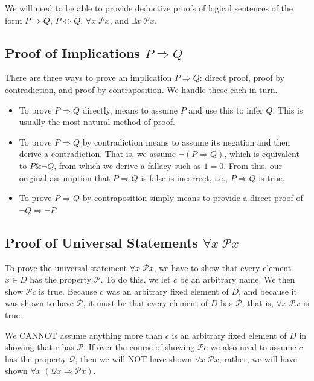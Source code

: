 \documentclass[a4paper,11pt]{article}
\newcommand{\PP}{\mathscr{P}}
\newcommand{\QQ}{\mathscr{Q}}
\begin{document}
We will need to be able to provide deductive proofs of logical sentences of the
form $P \Rightarrow Q$, $P \Leftrightarrow Q$, $\forall x\;\PP x$, and $\exists
x\;\PP x$. 

\subsection*{Proof of Implications $P \Rightarrow Q$}

There are three ways to prove an implication $P \Rightarrow Q$: direct proof,
proof by contradiction, and proof by contraposition. We handle these each in
turn.
\begin{itemize}
\item To prove $P \Rightarrow Q$ directly, means to assume $P$ and use this to
  infer $Q$. This is usually the most natural method of proof.
\item To prove $P \Rightarrow Q$ by contradiction means to assume its negation
  and then derive a contradiction. That is, we assume $\neg(P \Rightarrow Q)$,
  which is equivalent to $P \& \neg Q$, from which we derive a fallacy such as
  $1=0$. From this, our original assumption that $P \Rightarrow Q$ is false is
  incorrect, i.e., $P \Rightarrow Q$ is true.
\item To prove $P \Rightarrow Q$ by contraposition simply means to provide a
  direct proof of $\neg Q \Rightarrow \neg P$.
\end{itemize}

\subsection*{Proof of Universal Statements $\forall x\;\PP x$}

To prove the universal statement $\forall x\;\PP x$, we have to show that every
element $x \in D$ has the property $\PP$. To do this, we let $c$ be an arbitrary
name. We then show $\PP c$ is true. Because $c$ was an arbitrary fixed element
of $D$, and because it was shown to have $\PP$, it must be that every element of
$D$ has $\PP$, that is, $\forall x\;\PP x$ is true.

We CANNOT assume anything more than $c$ is an arbitrary fixed element of $D$ in
showing that $c$ has $\PP$. If over the course of showing $\PP c$ we also need
to assume $c$ has the property $\QQ$, then we will NOT have shown $\forall
x\;\PP x$; rather, we will have shown $\forall x\;(\QQ x \Rightarrow \PP x)$.
\end{document}
